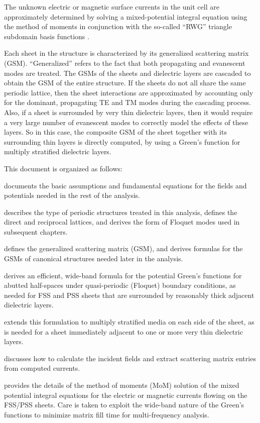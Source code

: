 \documentclass[
letterpaper, %
11pt, %
oneside, 
onecolumn, %
openany, %
]{memoir}
\numberwithin{equation}{chapter}
\numberwithin{figure}{chapter}
\begin{document}
The unknown electric or magnetic surface currents in the unit cell are
approximately determined by solving a mixed-potential integral
equation using
the method of moments in conjunction with the so-called ``RWG''
triangle subdomain basis functions \cite{rawg:82}. 

Each sheet in the structure is characterized by its generalized
scattering matrix (GSM).  ``Generalized'' refers to the fact that both
propagating and evanescent modes are treated.  The GSMs of the sheets
and dielectric layers are cascaded to obtain the GSM of the entire
structure. If the sheets do not all share the same periodic lattice,
then the sheet interactions are approximated by accounting only for
the dominant, propagating TE and TM modes during the cascading
process.  Also, if a sheet is surrounded by very thin dielectric
layers, then it would require a very large number of evanescent modes
to correctly model the effects of these layers.  So in this case, the
composite GSM of the sheet together with its surrounding thin layers
is directly computed, by
using a Green's function for multiply stratified dielectric layers.

This document is organized as follows:
\begin{description}[align=left]
  \item[Chapter~\ref{chap:fund}] documents the basic assumptions and
  fundamental equations for the fields and potentials needed in the
  rest of the analysis.
  \item[Chapter~\ref{chap:periodicity}] describes the type of
  periodic structures treated in this analysis, defines the direct and
  reciprocal lattices, and derives the form of Floquet modes used in
  subsequent chapters.
  \item[Chapter~\ref{chap:gsm}] defines the generalized 
  scattering matrix (GSM), and derives formulas for the GSMs of
  canonical structures needed later in the analysis.
  \item[Chapter~\ref{chap:mpgf}] derives an efficient, wide-band
  formula for the potential Green's functions for abutted half-spaces
  under quasi-periodic (Floquet) boundary conditions, as needed for
  FSS and PSS sheets that are surrounded by reasonably thick adjacent
  dielectric layers.
  \item[Chapter~\ref{chap:gfstratified}] extends this formulation to
  multiply stratified media on each side of the sheet, as is needed for
  a sheet immediately adjacent to one or more very thin dielectric
  layers.
  \item[Chapter~\ref{chap:incgsm}] discusses how to calculate the
  incident fields and extract scattering matrix entries from computed 
  currents.
  \item[Chapter~\ref{chap:mom}] provides the details of the method of
    moments (MoM) solution of the mixed potential integral equations for  
    the electric or magnetic currents flowing on the FSS/PSS sheets.
    Care is taken to exploit the wide-band nature of the Green's
    functions to minimize matrix fill time for multi-frequency
    analysis.
\end{description}
\end{document}
